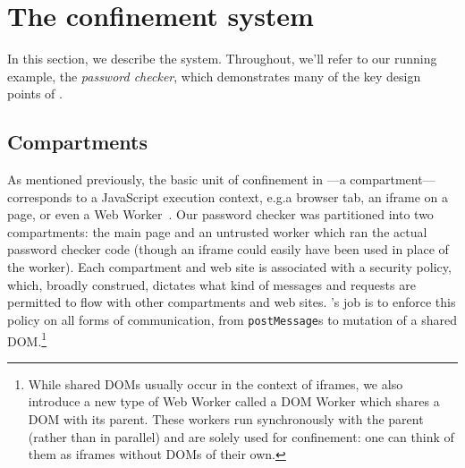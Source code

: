 \section{The \sys{} confinement system}
\label{sec:system}

In this section, we describe the \sys{} system.
%
Throughout, we'll refer to our running example, the \emph{password
checker}, which demonstrates many of the key design points of \sys{}.

\subsection{Compartments}




As mentioned previously, the basic unit of confinement in \sys{}---a
compartment---corresponds to a JavaScript execution context, e.g.\@ a
browser tab, an iframe on a page, or even a Web Worker~\cite{workers}.
%
Our password checker was partitioned into two compartments: the main
page and an untrusted worker which ran the actual password checker code
(though an iframe could easily have been used in place of the worker).
%
Each compartment and web site is associated with a security policy,
which, broadly construed, dictates what kind of messages and requests
are permitted to flow with other compartments and web sites.
%
\sys{}'s job is to enforce this policy on all forms of communication, from
{\tt postMessage}s to mutation of a shared DOM\@.\footnote{While shared DOMs
usually occur in the context of iframes, we also introduce a new type
of Web Worker called a DOM Worker which shares a DOM with its parent.
These workers run synchronously with the parent (rather than in parallel)
and are solely used for confinement: one can think of them as iframes
without DOMs of their own.}

